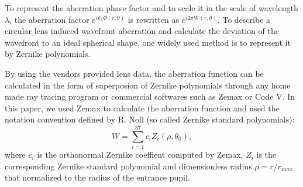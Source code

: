 \documentclass[9pt,twocolumn,twoside]{osajnl}
\begin{document}
To represent the aberration phase factor and to scale it in the scale of wavelength $\lambda$, the aberration factor $e^{ik_1\Phi(r,\theta)}$ is rewritten as $e^{i2\pi W(r,\theta)}$. To describe a circular lens induced wavefront aberration and calculate the deviation of the wavefront to an ideal spherical shape, one widely used method is to represent it by Zernike polynomials.  %

By using the vendors provided lens data, the aberration function can be calculated in the form of superposion of Zernike polynomials through any home made ray tracing program or commercial softwares such as Zemax or Code V. In this paper, we used Zemax to calculate the aberration function and used the notation convention defined by R. Noll \cite{Noll1976} (so called Zernike standard polynomials):
\begin{equation}\label{eq:22b}
	W = \sum_{i=1}^{37}c_iZ_i(\rho,\theta_0),
\end{equation}
where $c_i$ is the orthonormal Zernike coeffient computed by Zemax, $Z_i$ is the corresponding Zernike standard polynomial and dimensionless radius $\rho = r/r_{max}$ that normalized to the radius of the entrance pupil.
\end{document}
